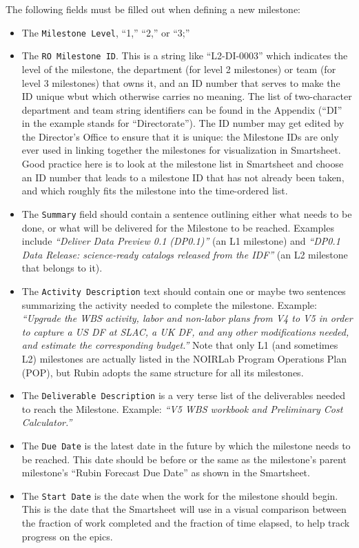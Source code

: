 The following fields must be filled out when defining a new milestone:
\begin{itemize} 
\item 
  The \texttt{Milestone Level}, ``1,'' ``2,'' or ``3;''
\item
  The \texttt{RO Milestone ID}. 
  This is a string like ``L2-DI-0003'' which indicates the level of the milestone, the department (for level 2 milestones) or team (for level 3 milestones) that owns it, and an ID number that serves to make the ID unique wbut which otherwise carries no meaning. 
  The list of two-character department and team string identifiers can be found in the Appendix (``DI'' in the example stands for ``Directorate''). 
  The ID number may get edited by the Director's Office to ensure that it is unique: the Milestone IDs are only ever used in linking together the milestones for visualization in Smartsheet. 
  Good practice here is to look at the milestone list in Smartsheet and choose an ID number that leads to a milestone ID that has not already been taken, and which roughly fits the milestone into the time-ordered list.  
\item
  The \texttt{Summary} field should contain a sentence outlining either what needs to be done, or what will be delivered for the Milestone to be reached. 
  Examples include \textit{``Deliver Data Preview 0.1 (DP0.1)''} (an L1 milestone) and \textit{``DP0.1 Data Release: science-ready catalogs released from the IDF''} (an L2 milestone that belongs to it).
\item  
  The \texttt{Activity Description} text should contain one or maybe two sentences summarizing the activity needed to complete the milestone. 
  Example: \textit{``Upgrade the WBS activity, labor and non-labor plans from V4 to V5 in order to capture a US DF at SLAC, a UK DF, and any other modifications needed, and estimate the corresponding budget.''} 
  Note that only L1 (and sometimes L2) milestones are actually listed in the NOIRLab Program Operations Plan (POP), but Rubin adopts the same structure for all its milestones.
\item
  The \texttt{Deliverable Description} is a very terse list of the deliverables needed to reach the Milestone. 
  Example: \textit{``V5 WBS workbook and Preliminary Cost Calculator.''}
\item 
  The \texttt{Due Date} is the latest date in the future by which the milestone needs to be reached. 
  This date should be before or the same as the milestone's parent milestone's ``Rubin Forecast Due Date'' as shown in the Smartsheet. 
\item
  The \texttt{Start Date} is the date when the work for the milestone should begin.
  This is the date that the Smartsheet will use in a visual comparison between the fraction of work completed and the fraction of time elapsed, to help track progress on the epics. 
\end{itemize}


